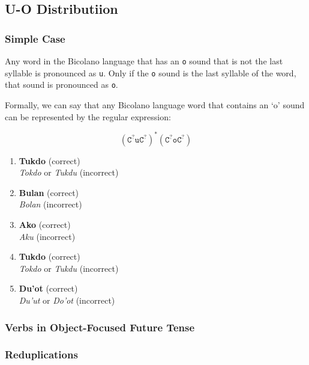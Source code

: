 \subsection{U-O Distributiion}

\subsubsection{Simple Case}
Any word in the Bicolano language that has an \texttt{o} sound that is not the last syllable is pronounced as \texttt{u}. Only if the \texttt{o} sound is the last syllable of the word, that sound is pronounced as \texttt{o}. 

Formally, we can say that any Bicolano language word that contains an ‘o’ sound can be represented by the regular expression:

\[
    \left(\texttt{C}^?\texttt{uC}^?\right)^* \left(\texttt{C}^?\texttt{oC}^?\right)
\]

\begin{example}
\end{example}

\begin{enumerate}
    \item \textbf{Tukdo} (correct) \\
    \textit{Tokdo} or \textit{Tukdu} (incorrect) \\
    \item \textbf{Bulan} (correct) \\
    \textit{Bolan} (incorrect) \\
    \item \textbf{Ako} (correct) \\
    \textit{Aku} (incorrect) \\
    \item \textbf{Tukdo} (correct) \\
    \textit{Tokdo} or \textit{Tukdu} (incorrect) \\
    \item \textbf{Du'ot} (correct) \\
    \textit{Du'ut} or \textit{Do'ot} (incorrect) \\
\end{enumerate}

\subsubsection{Verbs in Object-Focused Future Tense}



\subsubsection{Reduplications}



